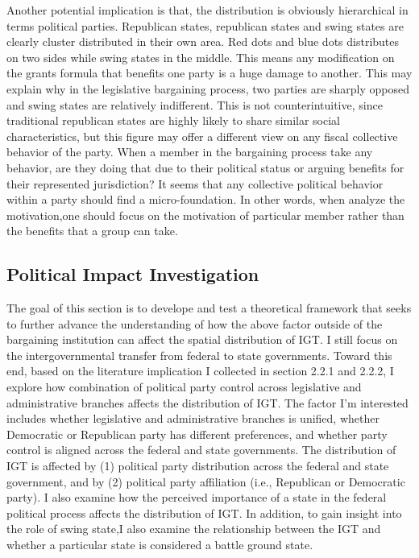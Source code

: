 Another potential implication is that, the distribution is obviously hierarchical  in terms political parties. Republican states, republican states and swing states are clearly cluster distributed in their own area. Red dots and blue dots distributes on two sides while swing states in the middle. This means any modification on the grants formula that benefits one party is a huge damage to another. This may explain why in the legislative bargaining process, two parties are sharply opposed and swing states are relatively indifferent. This is not counterintuitive, since traditional republican states are highly likely to share similar social characteristics, but this figure may offer a different view on any fiscal collective behavior of the party. When a member in the bargaining process take any behavior, are they doing that due to their political status or arguing benefits for their represented jurisdiction? It seems that any collective political behavior within a party should find a micro-foundation. In other words, when analyze the motivation,one should focus on the motivation of particular member rather than the benefits that a group can take.

\subsection{Political Impact Investigation}

The goal of this section is to  develope and test a theoretical framework that seeks to further advance the understanding of how the above factor outside of the bargaining institution can affect the spatial distribution of IGT. I still focus on the intergovernmental transfer from federal to state governments. Toward this end, based on the literature implication I collected in section 2.2.1 and 2.2.2, I explore how combination of political party control across legislative and administrative branches affects the distribution of IGT. The factor I'm interested includes whether legislative and administrative branches is unified, whether Democratic or Republican party has different preferences, and whether party control is aligned across the federal and state governments. The distribution of IGT is affected by (1) political party distribution across the federal and state government, and by (2) political party affiliation (i.e., Republican or Democratic party). I also examine how the perceived importance of a state in the federal political process affects the distribution of IGT. In addition, to gain insight into the role of swing state,I also examine the relationship between the IGT and whether a particular state is considered a battle ground state.

